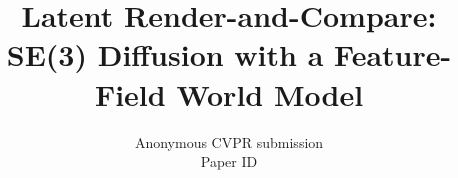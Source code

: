\documentclass[10pt,twocolumn,letterpaper]{article}
\title{Latent Render-and-Compare: SE(3) Diffusion with a Feature-Field World Model}
\author{Anonymous CVPR submission\\
Paper ID \paperID}
\begin{document}
\maketitle








{
    \small
    
    
}
\end{document}

